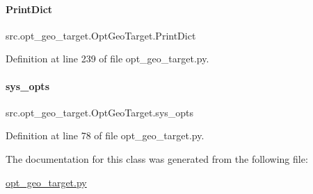 \paragraph{\texorpdfstring{Print\+Dict}{PrintDict}}
{\footnotesize\ttfamily src.\+opt\+\_\+geo\+\_\+target.\+Opt\+Geo\+Target.\+Print\+Dict}



Definition at line 239 of file opt\+\_\+geo\+\_\+target.\+py.

\mbox{\label{classsrc_1_1opt__geo__target_1_1OptGeoTarget_a301e9f7953425a4cf837077dd1cc6055}} 
\paragraph{\texorpdfstring{sys\+\_\+opts}{sys\_opts}}
{\footnotesize\ttfamily src.\+opt\+\_\+geo\+\_\+target.\+Opt\+Geo\+Target.\+sys\+\_\+opts}



Definition at line 78 of file opt\+\_\+geo\+\_\+target.\+py.



The documentation for this class was generated from the following file\+:\begin{DoxyCompactItemize}
\item 
\hyperlink{opt__geo__target_8py}{opt\+\_\+geo\+\_\+target.\+py}\end{DoxyCompactItemize}
